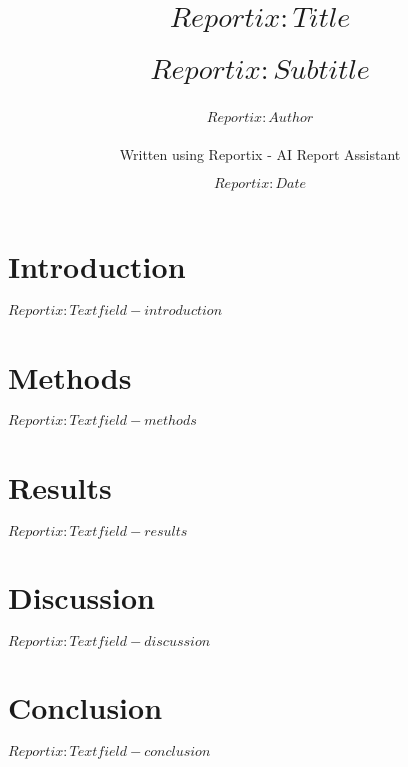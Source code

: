 \documentclass{scrreprt}
\title{
 $Reportix:Title$ \\
\begin{large}
  $Reportix:Subtitle$
\end{large}
}
\author{
$Reportix:Author$ \\
\begin{small}
  Written using Reportix - AI Report Assistant
\end{small}
}
\date{$Reportix:Date$}
\begin{document}
\maketitle
\section*{Introduction}
$Reportix:Textfield-introduction$
\section*{Methods}
$Reportix:Textfield-methods$
\section*{Results}
$Reportix:Textfield-results$
\section*{Discussion}
$Reportix:Textfield-discussion$
\section*{Conclusion}
$Reportix:Textfield-conclusion$
\end{document}
